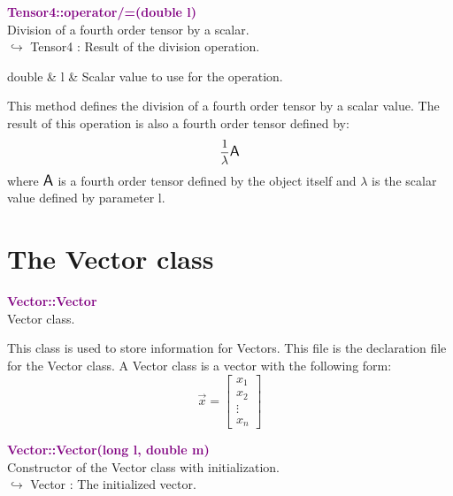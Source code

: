 \textcolor{purple}{\textbf{Tensor4::operator/=(double l)}}\label{Tensor4::operator/=(double l)}\\
Division of a fourth order tensor by a scalar.\\ \hspace*{10mm}$\hookrightarrow$ Tensor4 : Result of the division operation.

\begin{tcolorbox}[width=\textwidth,myArgs,tabularx={ll|R}]
double & l & Scalar value to use for the operation.
\end{tcolorbox}

This method defines the division of a fourth order tensor by a scalar value.
The result of this operation is also a fourth order tensor defined by:
\begin{equation*}
\frac{1}{\lambda} \mbox{\large\ensuremath{\mathsf{A}}}
\end{equation*}
where $\mbox{\large\ensuremath{\mathsf{A}}}$ is a fourth order tensor defined by the object itself and $\lambda$ is the scalar value defined by parameter l.

\section{The Vector class}

\textcolor{purple}{\textbf{Vector::Vector}}\label{Vector::Vector}\\
Vector class.

This class is used to store information for Vectors.
This file is the declaration file for the Vector class. A Vector class is a vector with the following form:
\begin{equation*}
\overrightarrow{x}=\left[\begin{array}{c}
  x_{1}\\
  x_{2}\\
  \vdots\\
  x_{n}
  \end{array}\right]
\end{equation*}

\textcolor{purple}{\textbf{Vector::Vector(long l, double m)}}\label{Vector::Vector(long l, double m)}\\
Constructor of the Vector class with initialization.\\ \hspace*{10mm}$\hookrightarrow$ Vector : The initialized vector.

